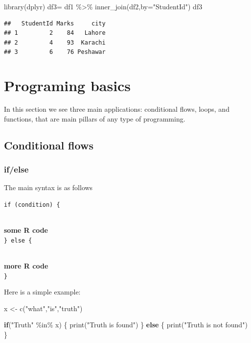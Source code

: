 \documentclass[
]{book}
\newenvironment{Shaded}{\begin{snugshade}}{\end{snugshade}}
\newcommand{\AttributeTok}[1]{\textcolor[rgb]{0.77,0.63,0.00}{#1}}
\newcommand{\ControlFlowTok}[1]{\textcolor[rgb]{0.13,0.29,0.53}{\textbf{#1}}}
\newcommand{\FunctionTok}[1]{\textcolor[rgb]{0.00,0.00,0.00}{#1}}
\newcommand{\NormalTok}[1]{#1}
\newcommand{\OtherTok}[1]{\textcolor[rgb]{0.56,0.35,0.01}{#1}}
\newcommand{\SpecialCharTok}[1]{\textcolor[rgb]{0.00,0.00,0.00}{#1}}
\newcommand{\StringTok}[1]{\textcolor[rgb]{0.31,0.60,0.02}{#1}}
\begin{document}
\begin{Shaded}
\begin{Highlighting}[]
\FunctionTok{library}\NormalTok{(dplyr)}
\NormalTok{df3}\OtherTok{=}\NormalTok{ df1 }\SpecialCharTok{\%\textgreater{}\%} \FunctionTok{inner\_join}\NormalTok{(df2,}\AttributeTok{by=}\StringTok{"StudentId"}\NormalTok{)}
\NormalTok{df3}
\end{Highlighting}
\end{Shaded}

\begin{verbatim}
##   StudentId Marks     city
## 1         2    84   Lahore
## 2         4    93  Karachi
## 3         6    76 Peshawar
\end{verbatim}

\hypertarget{programing-basics}{%
\chapter{Programing basics}\label{programing-basics}}

In this section we see three main applications: conditional flows, loops, and functions, that are main pillars of any type of programming.

\hypertarget{conditional-flows}{%
\section{Conditional flows}\label{conditional-flows}}

\hypertarget{ifelse}{%
\subsection{if/else}\label{ifelse}}

The main syntax is as follows

\texttt{if\ (condition)\ \{}\strut \\
\textbf{some R code}\\
\texttt{\}\ else\ \{}\strut \\
\textbf{more R code}\\
\texttt{\}}

Here is a simple example:

\begin{Shaded}
\begin{Highlighting}[]
\NormalTok{x }\OtherTok{\textless{}{-}} \FunctionTok{c}\NormalTok{(}\StringTok{"what"}\NormalTok{,}\StringTok{"is"}\NormalTok{,}\StringTok{"truth"}\NormalTok{)}

\ControlFlowTok{if}\NormalTok{(}\StringTok{"Truth"} \SpecialCharTok{\%in\%}\NormalTok{ x) \{}
   \FunctionTok{print}\NormalTok{(}\StringTok{"Truth is found"}\NormalTok{)}
\NormalTok{\} }\ControlFlowTok{else}\NormalTok{ \{}
   \FunctionTok{print}\NormalTok{(}\StringTok{"Truth is not found"}\NormalTok{)}
\NormalTok{\}}
\end{Highlighting}
\end{Shaded}
\end{document}

